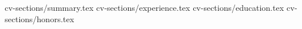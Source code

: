 \documentclass[11pt, a4paper]{awesome-cv}
\newcommand*{\sectiondir}{./}
\begin{document}
\makecvheader

{cv-sections/summary.tex}
{cv-sections/experience.tex}
{cv-sections/education.tex}
{cv-sections/honors.tex}
\end{document}
